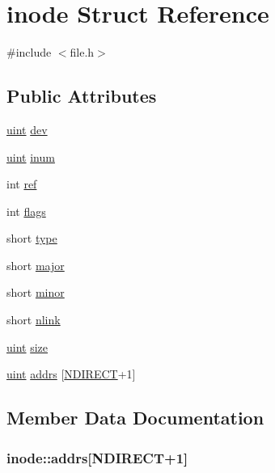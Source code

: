 \hypertarget{structinode}{}\section{inode Struct Reference}
\label{structinode}


{\ttfamily \#include $<$file.\+h$>$}

\subsection*{Public Attributes}
\begin{DoxyCompactItemize}
\item 
\hyperlink{custom__types_8h_a91ad9478d81a7aaf2593e8d9c3d06a14}{uint} \hyperlink{structinode_a121742a89c4531f03a7de1613d5be605}{dev}
\item 
\hyperlink{custom__types_8h_a91ad9478d81a7aaf2593e8d9c3d06a14}{uint} \hyperlink{structinode_a8acc2b9df0bfc6856da62925763db7fe}{inum}
\item 
int \hyperlink{structinode_a6a519028ee67f805482b3e1725bf09c5}{ref}
\item 
int \hyperlink{structinode_a47516965aad946199a3a4c95b884c3b3}{flags}
\item 
short \hyperlink{structinode_a8d74bec2898785c057111c328d23fda2}{type}
\item 
short \hyperlink{structinode_a34af7242018a977dace5730683850875}{major}
\item 
short \hyperlink{structinode_a37878866e7905b666db2aa33076076a2}{minor}
\item 
short \hyperlink{structinode_af8b88b409bea7ef99c49a55f387538b2}{nlink}
\item 
\hyperlink{custom__types_8h_a91ad9478d81a7aaf2593e8d9c3d06a14}{uint} \hyperlink{structinode_a918af769c48a8ca8afac057bf83d12de}{size}
\item 
\hyperlink{custom__types_8h_a91ad9478d81a7aaf2593e8d9c3d06a14}{uint} \hyperlink{structinode_a7ba4ab7e52404b80d6d854678715ae30}{addrs} \mbox{[}\hyperlink{fs_8h_acd38e9532d4b3623f844b93c012a8e06}{N\+D\+I\+R\+E\+CT}+1\mbox{]}
\end{DoxyCompactItemize}


\subsection{Member Data Documentation}
\subsubsection[{\texorpdfstring{addrs}{addrs}}]{ inode\+::addrs\mbox{[}{\bf N\+D\+I\+R\+E\+CT}+1\mbox{]}}\hypertarget{structinode_a7ba4ab7e52404b80d6d854678715ae30}{}\label{structinode_a7ba4ab7e52404b80d6d854678715ae30}
